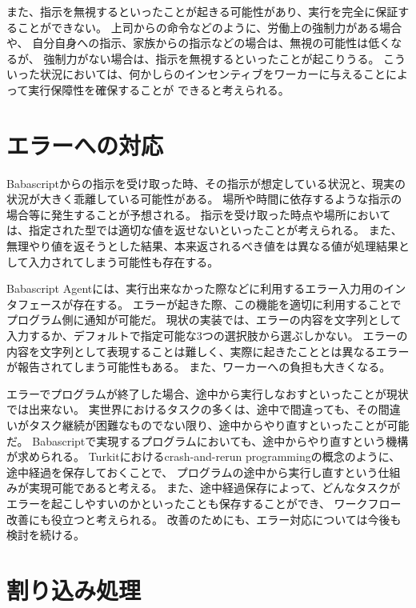 また、指示を無視するといったことが起きる可能性があり、実行を完全に保証することができない。
上司からの命令などのように、労働上の強制力がある場合や、
自分自身への指示、家族からの指示などの場合は、無視の可能性は低くなるが、
強制力がない場合は、指示を無視するといったことが起こりうる。
こういった状況においては、何かしらのインセンティブをワーカーに与えることによって実行保障性を確保することが
できると考えられる。

\section{エラーへの対応}\label{ux30a8ux30e9ux30fcux3078ux306eux5bfeux5fdc}

Babascriptからの指示を受け取った時、その指示が想定している状況と、現実の状況が大きく乖離している可能性がある。
場所や時間に依存するような指示の場合等に発生することが予想される。
指示を受け取った時点や場所においては、指定された型では適切な値を返せないといったことが考えられる。
また、無理やり値を返そうとした結果、本来返されるべき値をは異なる値が処理結果として入力されてしまう可能性も存在する。

Babascript
Agentには、実行出来なかった際などに利用するエラー入力用のインタフェースが存在する。
エラーが起きた際、この機能を適切に利用することでプログラム側に通知が可能だ。
現状の実装では、エラーの内容を文字列として入力するか、デフォルトで指定可能な3つの選択肢から選ぶしかない。
エラーの内容を文字列として表現することは難しく、実際に起きたこととは異なるエラーが報告されてしまう可能性もある。
また、ワーカーへの負担も大きくなる。

エラーでプログラムが終了した場合、途中から実行しなおすといったことが現状では出来ない。
実世界におけるタスクの多くは、途中で間違っても、その間違いがタスク継続が困難なものでない限り、途中からやり直すといったことが可能だ。
Babascriptで実現するプログラムにおいても、途中からやり直すという機構が求められる。
Turkit\cite{turkit}におけるcrash-and-rerun
programmingの概念のように、途中経過を保存しておくことで、
プログラムの途中から実行し直すという仕組みが実現可能であると考える。
また、途中経過保存によって、どんなタスクがエラーを起こしやすいのかといったことも保存することができ、
ワークフロー改善にも役立つと考えられる。
改善のためにも、エラー対応については今後も検討を続ける。

\section{割り込み処理}\label{ux5272ux308aux8fbcux307fux51e6ux7406}

